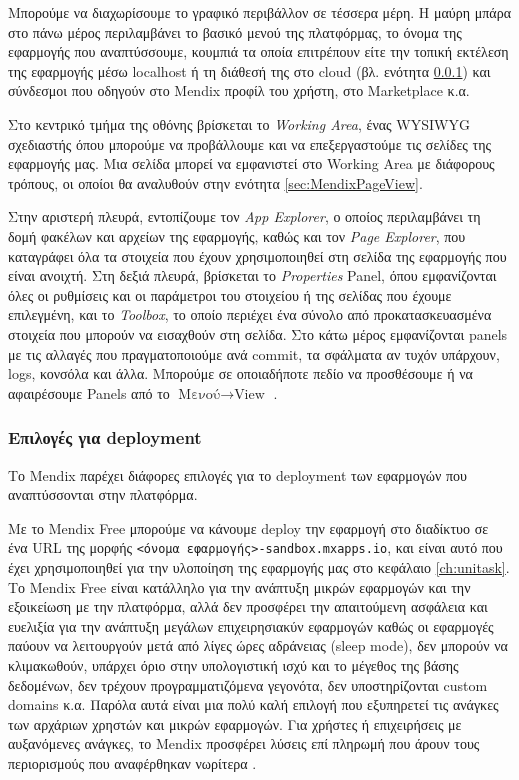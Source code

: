         Μπορούμε να διαχωρίσουμε το γραφικό περιβάλλον σε τέσσερα μέρη. Η μαύρη μπάρα στο πάνω μέρος περιλαμβάνει το βασικό μενού της πλατφόρμας, το όνομα της εφαρμογής που αναπτύσσουμε, κουμπιά τα οποία επιτρέπουν είτε την τοπική εκτέλεση της εφαρμογής μέσω localhost ή τη διάθεσή της στο cloud (βλ. ενότητα \ref{sec:MendixDeployment}) και σύνδεσμοι που οδηγούν στο Mendix προφίλ του χρήστη, στο Marketplace κ.α.

        Στο κεντρικό τμήμα της οθόνης βρίσκεται το \textit{Working Area}, ένας WYSIWYG σχεδιαστής όπου μπορούμε να προβάλλουμε και να επεξεργαστούμε τις σελίδες της εφαρμογής μας. Μια σελίδα μπορεί να εμφανιστεί στο Working Area με διάφορους τρόπους, οι οποίοι θα αναλυθούν στην ενότητα \ref{sec:MendixPageView}.

        Στην αριστερή πλευρά, εντοπίζουμε τον \textit{App Explorer}, ο οποίος περιλαμβάνει τη δομή φακέλων και αρχείων της εφαρμογής, καθώς και τον \textit{Page Explorer}, που καταγράφει όλα τα στοιχεία που έχουν χρησιμοποιηθεί στη σελίδα της εφαρμογής που είναι ανοιχτή. Στη δεξιά πλευρά, βρίσκεται το \textit{Properties} Panel, όπου εμφανίζονται όλες οι ρυθμίσεις και οι παράμετροι του στοιχείου ή της σελίδας που έχουμε επιλεγμένη, και το \textit{Toolbox}, το οποίο περιέχει ένα σύνολο από προκατασκευασμένα στοιχεία που μπορούν να εισαχθούν στη σελίδα. Στο κάτω μέρος εμφανίζονται panels με τις αλλαγές που πραγματοποιούμε ανά commit, τα σφάλματα αν τυχόν υπάρχουν, logs, κονσόλα και άλλα. Μπορούμε σε οποιαδήποτε πεδίο να προσθέσουμε ή να αφαιρέσουμε Panels από το $ \text{Μενού} \rightarrow \text{View} $ \cite{mendixDoc}.

        \subsubsection{Επιλογές για deployment} \label{sec:MendixDeployment}
            Το Mendix παρέχει διάφορες επιλογές για το deployment των εφαρμογών που αναπτύσσονται στην πλατφόρμα.

            Με το Mendix Free μπορούμε να κάνουμε deploy την εφαρμογή στο διαδίκτυο σε ένα URL της μορφής \texttt{<όνομα εφαρμογής>-sandbox.mxapps.io}, και είναι αυτό που έχει χρησιμοποιηθεί για την υλοποίηση της εφαρμογής μας στο κεφάλαιο \ref{ch:unitask}. Το Mendix Free είναι κατάλληλο για την ανάπτυξη μικρών εφαρμογών και την εξοικείωση με την πλατφόρμα, αλλά δεν προσφέρει την απαιτούμενη ασφάλεια και ευελιξία για την ανάπτυξη μεγάλων επιχειρησιακύν εφαρμογών καθώς οι εφαρμογές παύουν να λειτουργούν μετά από λίγες ώρες αδράνειας (sleep mode), δεν μπορούν να κλιμακωθούν, υπάρχει όριο στην υπολογιστική ισχύ και το μέγεθος της βάσης δεδομένων, δεν τρέχουν προγραμματιζόμενα γεγονότα, δεν υποστηρίζονται custom domains κ.α. Παρόλα αυτά είναι μια πολύ καλή επιλογή που εξυπηρετεί τις ανάγκες των αρχάριων χρηστών και μικρών εφαρμογών. Για χρήστες ή επιχειρήσεις με αυξανόμενες ανάγκες, το Mendix προσφέρει λύσεις επί πληρωμή που άρουν τους περιορισμούς που αναφέρθηκαν νωρίτερα \cite{mendixCloud}.

